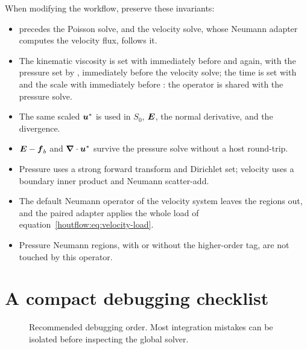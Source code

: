 When modifying the workflow, preserve these invariants:
\begin{itemize}
  \item {} precedes the Poisson solve, and the velocity
        solve, whose Neumann adapter computes the velocity flux, follows it.
  \item The kinematic viscosity is set with  immediately
        before  and again, with the pressure set by
        , immediately before the velocity solve; the time
        is set with  and the scale with 
        immediately before : the operator is shared
        with the pressure solve.
  \item The same scaled $\boldsymbol{u}^*$ is used in $S_0$, $\boldsymbol{E}$, the normal
        derivative, and the divergence.
  \item $\boldsymbol{E}-\boldsymbol{f}_b$ and $\boldsymbol{\nabla}\cdot\boldsymbol{u}^*$ survive the pressure
        solve without a host round-trip.
  \item Pressure uses a strong forward transform and Dirichlet set; velocity
        uses a boundary inner product and Neumann scatter-add.
  \item The default Neumann operator of the velocity system leaves the
        \HOutflow{} regions out, and the paired adapter applies the whole
        load of equation~\eqref{houtflow:eq:velocity-load}.
  \item Pressure Neumann regions, with or without the higher-order tag, are
        not touched by this operator.
\end{itemize}

\FloatBarrier
\section{A compact debugging checklist}

\begin{figure}[htbp]
\centering
{}
\caption{Recommended debugging order.  Most integration mistakes can be
isolated before inspecting the global solver.}
\label{houtflow:fig:debug}
\end{figure}

